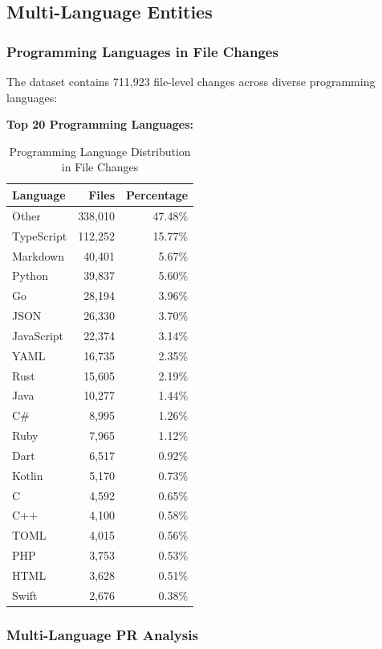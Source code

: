 \documentclass[11pt]{article}
\begin{document}
\subsection{Multi-Language Entities}

\subsubsection{Programming Languages in File Changes}

The dataset contains 711,923 file-level changes across diverse programming languages:

\textbf{Top 20 Programming Languages:}
\begin{table}[H]
\centering
\caption{Programming Language Distribution in File Changes}
\small
\begin{tabular}{@{}lrr@{}}
\toprule
\textbf{Language} & \textbf{Files} & \textbf{Percentage} \\
\midrule
Other & 338,010 & 47.48\% \\
TypeScript & 112,252 & 15.77\% \\
Markdown & 40,401 & 5.67\% \\
Python & 39,837 & 5.60\% \\
Go & 28,194 & 3.96\% \\
JSON & 26,330 & 3.70\% \\
JavaScript & 22,374 & 3.14\% \\
YAML & 16,735 & 2.35\% \\
Rust & 15,605 & 2.19\% \\
Java & 10,277 & 1.44\% \\
C\# & 8,995 & 1.26\% \\
Ruby & 7,965 & 1.12\% \\
Dart & 6,517 & 0.92\% \\
Kotlin & 5,170 & 0.73\% \\
C & 4,592 & 0.65\% \\
C++ & 4,100 & 0.58\% \\
TOML & 4,015 & 0.56\% \\
PHP & 3,753 & 0.53\% \\
HTML & 3,628 & 0.51\% \\
Swift & 2,676 & 0.38\% \\
\bottomrule
\end{tabular}
\end{table}

\subsubsection{Multi-Language PR Analysis}
\end{document}
